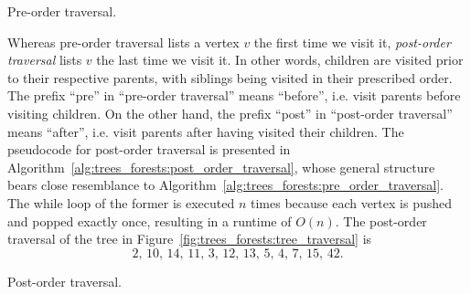 \begin{algorithm}[!htbp]

\caption{Pre-order traversal.}
\label{alg:trees_forests:pre_order_traversal}
\end{algorithm}

Whereas pre-order traversal lists a vertex $v$ the first time we visit
it, \emph{post-order traversal} lists $v$
the last time we visit it. In other words, children are visited prior
to their respective parents, with siblings being visited in their
prescribed order. The prefix ``pre'' in ``pre-order traversal'' means
``before'', i.e. visit parents before visiting children. On the other
hand, the prefix ``post'' in ``post-order traversal'' means ``after'',
i.e. visit parents after having visited their children. The pseudocode
for post-order traversal is presented in
Algorithm~\ref{alg:trees_forests:post_order_traversal}, whose general
structure bears close resemblance to
Algorithm~\ref{alg:trees_forests:pre_order_traversal}. The while loop
of the former is executed $n$ times because each vertex is
pushed and popped exactly once,
resulting in a runtime of $O(n)$. The
post-order traversal of the tree in
Figure~\ref{fig:trees_forests:tree_traversal} is
\[
2,\, 10,\, 14,\, 11,\, 3,\, 12,\, 13,\, 5,\, 4,\, 7,\, 15,\, 42.
\]

\begin{algorithm}[!htbp]

\caption{Post-order traversal.}
\label{alg:trees_forests:post_order_traversal}
\end{algorithm}

